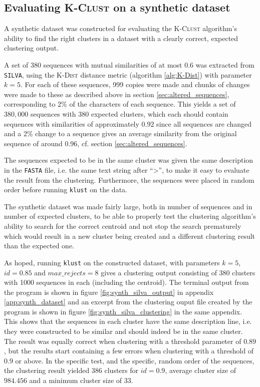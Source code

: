 \subsection{Evaluating \textsc{K-Clust} on a synthetic dataset}
\label{sec:synth_dataset}

A synthetic dataset was constructed for evaluating the \textsc{K-Clust}
algorithm's ability to find the right clusters in a dataset with a clearly
correct, expected clustering output.

A set of 380 sequences with mutual similarities of at most 0.6 was extracted
from \texttt{SILVA}, using the \textsc{K-Dist} distance metric (algorithm
\ref{alg:K-Dist}) with parameter $k=5$. For each of these sequences, 999 copies
were made and chunks of changes were made to these as described above in
section \ref{sec:altered_sequences}, corresponding to 2\% of the characters of
each sequence. This yields a set of $380,000$ sequences with 380 expected
clusters, which each should contain sequences with similarities of
approximately $0.92$ since all sequences are changed and a 2\% change to a
sequence gives an average similarity from the original sequence of around
$0.96$, cf. section \ref{sec:altered_sequences}.

The sequences expected to be in the same cluster was given the same description
in the \texttt{FASTA} file, i.e. the same text string after ``>'', to make it
easy to evaluate the result from the clustering. Furthermore, the sequences
were placed in random order before running \texttt{klust} on the data.

The synthetic dataset was made fairly large, both in number of sequences and in
number of expected clusters, to be able to properly test the clustering
algorithm's ability to search for the correct centroid and not stop the search
prematurely which would result in a new cluster being created and a different
clustering result than the expected one.

As hoped, running \texttt{klust} on the constructed dataset, with parameters
$k=5$, $id=0.85$ and $max\_rejects=8$ gives a clustering output consisting of
380 clusters with 1000 sequences in each (including the centroid). The terminal
output from the program is shown in figure \ref{fig:synth_silva_output} in
appendix \ref{app:synth_dataset} and an excerpt from the clustering ouput file
created by the program is shown in figure \ref{fig:synth_silva_clustering} in
the same appendix. This shows that the sequences in each cluster have the same
description line, i.e. they were constructed to be similar and should indeed be
in the same cluster. The result was equally correct when clustering with a
threshold parameter of $0.89$, but the results start containing a few errors
when clustering with a threshold of $0.9$ or above. In the specific test, and
the specific, random order of the sequences, the clustering result yielded 386
clusters for $id=0.9$, average cluster size of $984.456$ and a minimum cluster
size of $33$.

